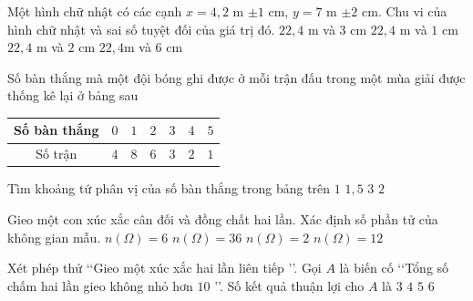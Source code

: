 \begin{ex}%
Một hình chữ nhật có các cạnh $x = 4{,}2$ m $\pm 1$ cm, $y = 7$ m $\pm 2$ cm. Chu vi của hình chữ nhật và sai số tuyệt đối của giá trị đó.
\choice
{$22{,}4$ m và $3$ cm}
{$22{,}4$ m và $1$ cm}
{$22{,}4$ m và $2$ cm}
{\True $22{,}4$m và $6$ cm}
\end{ex}

\begin{ex}%
Số bàn thắng mà một đội bóng ghi được ở mỗi trận đấu trong một mùa giải được thống kê lại ở bảng sau
\begin{center}
\begin{tabular}{|c|c|c|c|c|c|c|}
\hline
Số bàn thắng&$0$&$1$&$2$&$3$&$4$&$5$\\
\hline
Số trận&$4$&$8$&$6$&$3$&$2$&$1$\\
\hline
\end{tabular}
\end{center}
Tìm khoảng tứ phân vị của số bàn thắng trong bảng trên
\choice
{$1$}
{\True $1{,}5$}
{$3$}
{$2$}
\end{ex}

\begin{ex}%
Gieo một con xúc xắc cân đối và đồng chất hai lần. Xác định số phần tử của không gian mẫu.
\choice
{$ n\left(\Omega\right)=6$}
{\True $ n\left(\Omega\right)=36$}
{$ n\left(\Omega\right)=2$}
{$ n\left(\Omega\right)=12$}
\end{ex}

\begin{ex}%
Xét phép thử  \lq\lq Gieo một xúc xắc hai lần liên tiếp \rq\rq. Gọi $A$ là biến cố \lq\lq Tổng số chấm hai lần gieo không nhỏ hơn $10$ \rq\rq. Số kết quả thuận lợi cho $A$ là
\choice
{$3$}
{\True $4$}
{$5$}
{$6$}
\end{ex}

